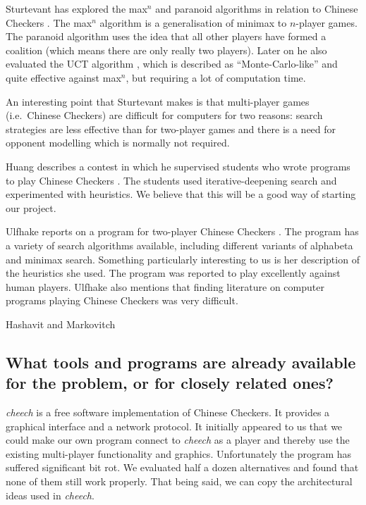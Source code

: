 \documentclass[a4paper,11pt]{article}
\begin{document}
Sturtevant has explored the max$^n$ and paranoid algorithms in
relation to Chinese Checkers
\cite{springerlink:10.1007/978-3-540-40031-8_8}. The max$^n$ algorithm
is a generalisation of minimax to $n$-player games. The paranoid
algorithm uses the idea that all other players have formed a coalition
(which means there are only really two players). Later on he also
evaluated the UCT algorithm
\cite{springerlink:10.1007/978-3-540-87608-3_4}, which is described as
``Monte-Carlo-like'' and quite effective against max$^n$, but
requiring a lot of computation time.

An interesting point that Sturtevant makes is that multi-player games
(i.e.~Chinese Checkers) are difficult for computers for two reasons:
search strategies are less effective than for two-player games and
there is a need for opponent modelling which is normally not required.

Huang describes a contest in which he supervised students who wrote
programs to play Chinese Checkers \cite{Huang:2001:SGP:378593.378708}.
The students used iter\-ative-deep\-ening search and experimented with
heuristics. We believe that this will be a good way of starting our
project.

Ulfhake reports on a program for two-player Chinese Checkers
\cite{ulfhake}. The program has a variety of search algorithms
available, including different variants of alphabeta and minimax
search. Something particularly interesting to us is her description of
the heuristics she used. The program was reported to play excellently
against human players. Ulfhake also mentions that finding literature
on computer programs playing Chinese Checkers was very difficult.

Hashavit and Markovitch \cite{hashavit} 


\subsection{What tools and programs are already available for the problem, or for closely related ones?}

\emph{cheech} is a free software implementation of Chinese Checkers.
It provides a graphical interface and a network protocol. It initially
appeared to us that we could make our own program connect to
\emph{cheech} as a player and thereby use the existing multi-player
functionality and graphics. Unfortunately the program has suffered
significant bit rot. We evaluated half a dozen alternatives and found
that none of them still work properly. That being said, we can copy
the architectural ideas used in \emph{cheech}.
\end{document}
